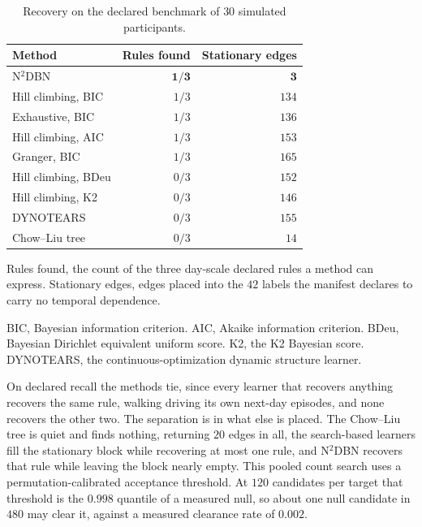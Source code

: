 \documentclass[sigconf]{acmart}
\begin{document}
\begin{table}[t]
\caption{Recovery on the declared benchmark of $30$ simulated participants.}
\label{tab:exp-external}
\small
\begin{threeparttable}
\begin{tabular}{lrr}
\toprule
Method & Rules found & Stationary edges \\
\midrule
N$^2$DBN & $\mathbf{1/3}$ & $\mathbf{3}$ \\
\midrule
Hill climbing, BIC & $1/3$ & $134$ \\
Exhaustive, BIC & $1/3$ & $136$ \\
Hill climbing, AIC & $1/3$ & $153$ \\
Granger, BIC & $1/3$ & $165$ \\
Hill climbing, BDeu & $0/3$ & $152$ \\
Hill climbing, K2 & $0/3$ & $146$ \\
DYNOTEARS & $0/3$ & $155$ \\
Chow--Liu tree & $0/3$ & $14$ \\
\bottomrule
\end{tabular}
\begin{tablenotes}[flushleft]\footnotesize
\item Rules found, the count of the three day-scale declared rules a method can express. Stationary edges, edges placed into the $42$ labels the manifest declares to carry no temporal dependence.
\item BIC, Bayesian information criterion. AIC, Akaike information criterion. BDeu, Bayesian Dirichlet equivalent uniform score. K2, the K2 Bayesian score. DYNOTEARS, the continuous-optimization dynamic structure learner.
\end{tablenotes}
\end{threeparttable}
\end{table}

On declared recall the methods tie, since every learner that recovers anything recovers the same rule, walking driving its own next-day episodes, and none recovers the other two. The separation is in what else is placed. The Chow--Liu tree is quiet and finds nothing, returning $20$ edges in all, the search-based learners fill the stationary block while recovering at most one rule, and N$^2$DBN recovers that rule while leaving the block nearly empty. This pooled count search uses a permutation-calibrated acceptance threshold. At $120$ candidates per target that threshold is the $0.998$ quantile of a measured null, so about one null candidate in $480$ may clear it, against a measured clearance rate of $0.002$.
\end{document}

